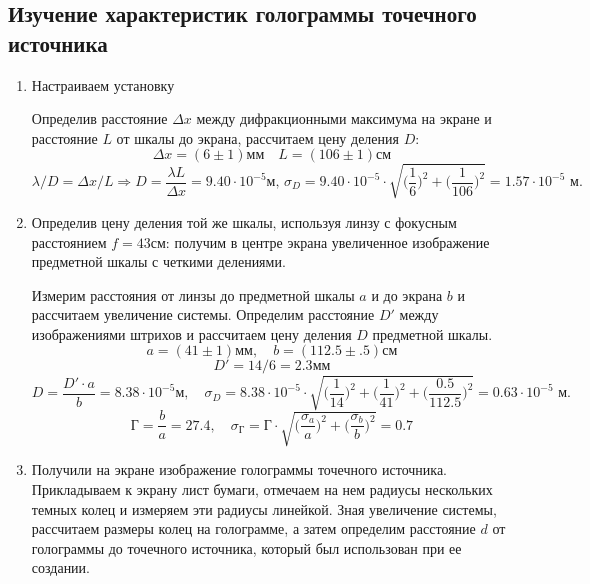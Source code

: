 \documentclass[a4paper,12pt]{article}
\begin{document}
\subsection{Изучение характеристик голограммы точечного источника}
\begin{enumerate}
    \item Настраиваем установку

    Определив расстояние $\Delta x$ между дифракционными максимума на экране и расстояние $L$ от шкалы до экрана, рассчитаем цену деления $D$:
    $$
    \Delta x=(6\pm1)\text{мм} \quad L= (106\pm1)\text{см}
    $$
    $$
    \lambda/D=\Delta x/L \Longrightarrow D=\frac{\lambda L}{\Delta x}=9.40\cdot 10^{-5}\text{м, }
    \sigma_D=9.40\cdot10^{-5}\cdot\sqrt{\Big(\frac{1}{6}\Big)^2+\Big(\frac{1}{106}\Big)^2}=1.57\cdot10^{-5}\text{ м.}
    $$
    \item Определив цену деления той же шкалы, используя линзу с фокусным расстоянием $f=43$см: получим в центре экрана увеличенное изображение предметной шкалы с четкими делениями.

    Измерим расстояния от линзы до предметной шкалы $a$ и до экрана $b$ и рассчитаем увеличение системы. Определим расстояние $D'$ между изображениями штрихов и рассчитаем цену деления $D$ предметной шкалы. 
    $$
    a=(41\pm1)\text{мм}, \quad b=(112.5\pm.5)\text{см}
    $$
    $$
    D'=14/6=2.3\text{мм}
    $$
    $$
    D=\frac{D'\cdot a}{b}=8.38\cdot 10^{-5}\text{м},\quad \sigma_D=8.38\cdot10^{-5}\cdot\sqrt{\Big(\frac{1}{14}\Big)^2+\Big(\frac{1}{41}\Big)^2+\Big(\frac{0.5}{112.5}\Big)^2}=0.63\cdot10^{-5}\text{ м.}
    $$
    $$
    \text{Г}=\frac{b}{a}=27.4, \quad \sigma_\text{Г}=\text{Г}\cdot\sqrt{\Big(\frac{\sigma_a}{a}\Big)^2+\Big(\frac{\sigma_b}{b}\Big)^2}=0.7
    $$

    \item Получили на экране изображение голограммы точечного источника. Прикладываем к экрану лист бумаги, отмечаем на нем радиусы нескольких темных колец и измеряем эти радиусы линейкой. Зная увеличение системы, рассчитаем размеры колец на голограмме, а затем определим расстояние $d$ от голограммы до точечного источника, который был использован при ее создании.


\end{enumerate}
\end{document}
